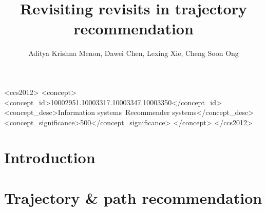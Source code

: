 \documentclass[sigconf]{acmart}
\begin{document}
\title{Revisiting revisits in trajectory recommendation}

\author{Aditya Krishna Menon, Dawei Chen, Lexing Xie, Cheng Soon Ong}

\begin{abstract}

\end{abstract}

%
%


\begin{CCSXML}
<ccs2012>
<concept>
<concept_id>10002951.10003317.10003347.10003350</concept_id>
<concept_desc>Information systems~Recommender systems</concept_desc>
<concept_significance>500</concept_significance>
</concept>
</ccs2012>
\end{CCSXML}


\maketitle

\section{Introduction}


\section{Trajectory \& path recommendation}
\label{sec:background}

\end{document}
